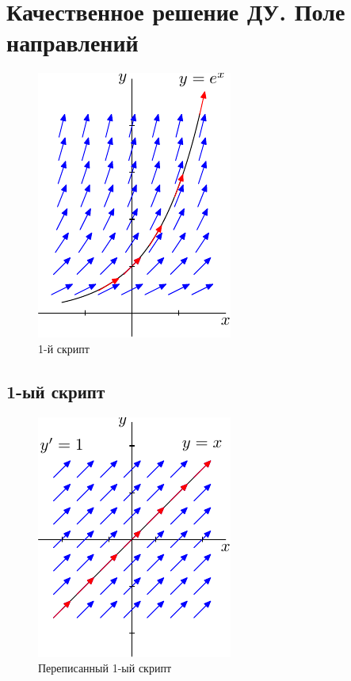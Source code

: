 \chapter{Качественное решение ДУ. Поле направлений}

\begin{figure}[h]
    \includegraphics{fig1-1.pdf}
    \centering
    \caption{1-й скрипт}
\end{figure}

\section*{1-ый скрипт}


\clearpage

\begin{figure}[h]
    \includegraphics{myfig1-1.pdf}
    \centering
    \caption{Переписанный 1-ый скрипт}
\end{figure}

